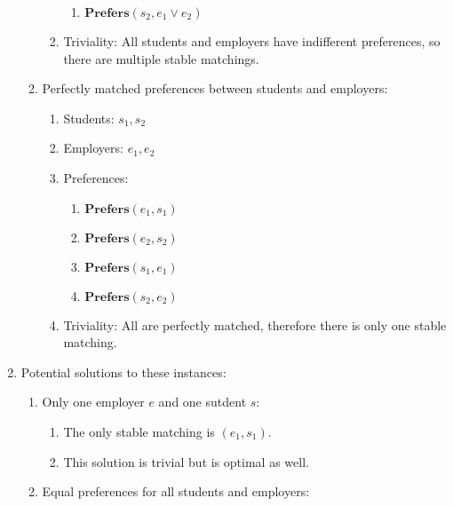 \documentclass[12pt]{article}
\begin{document}
\begin{enumerate}
\begin{enumerate}
\begin{enumerate}
\begin{enumerate}
                            \item $\textbf{Prefers}(s_2, e_1 \lor e_2)$
                        \end{enumerate}
                    \item Triviality: All students and employers have indifferent preferences, 
                    so there are multiple stable matchings.
                \end{enumerate}
                \item Perfectly matched preferences between students and employers:
                \begin{enumerate}
                    \item Students: ${s_1, s_2}$
                    \item Employers: ${e_1, e_2}$
                    \item Preferences:
                        \begin{enumerate}
                            \item $\textbf{Prefers}(e_1, s_1)$
                            \item $\textbf{Prefers}(e_2, s_2)$
                            \item $\textbf{Prefers}(s_1, e_1)$
                            \item $\textbf{Prefers}(s_2, e_2)$
                        \end{enumerate}
                    \item Triviality: All are perfectly matched, therefore there is only one stable matching.
                \end{enumerate}
                \end{enumerate}
        \item Potential solutions to these instances:
            \begin{enumerate}
                \item Only one employer $e$ and one sutdent $s$:
                \begin{enumerate}[-]
                    \item The only stable matching is $(e_1, s_1)$.
                    \item This solution is trivial but is optimal as well.
                \end{enumerate}
                \item Equal preferences for all students and employers:
                \begin{enumerate}[-]

\end{enumerate}
\end{enumerate}
\end{enumerate}
\end{document}
